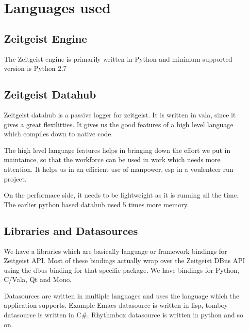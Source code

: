 \section{Languages used}

\subsection{Zeitgeist Engine}
The Zeitgeist engine is primarily written in Python and minimum supported version is Python 2.7


\subsection{Zeitgeist Datahub}
Zeitgeist datahub is a passive logger for zeitgeist. It is written in 
vala, since it gives a great flexilitties. It gives us the good features 
of a high level language which compiles down to native code. 

The high level language features helps in bringing down the effort we
put in maintaince, so that the workforce can be used in work which needs 
more attention. It helps us in an efficient use of manpower, esp in a 
voulenteer run project.

On the performace side, it needs to be lightweight as it is running all 
the time. The earlier python based datahub used 5 times more memory.

\subsection{Libraries and Datasources}
We have a libraries which are basically language or framework bindings 
for Zeitgeist API. Most of these bindings actually wrap over the 
Zeitgeist DBus API using the dbus binding for that specific package. 
We have bindings for Python, C/Vala, Qt and Mono.

Datasources are written in multiple languages and uses the language which 
the application supports. Example Emacs datasource is written in lisp, 
tomboy datasource is written in C\#, Rhythmbox datasource is written in 
python and so on.
